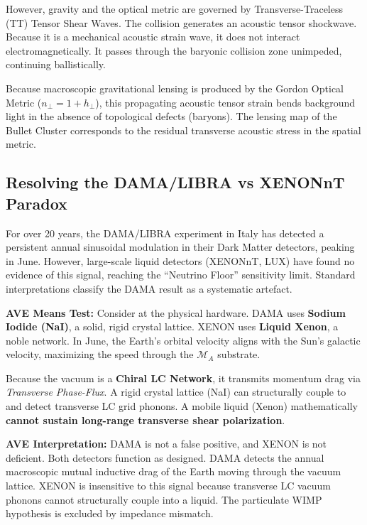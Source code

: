However, gravity and the optical metric are governed by Transverse-Traceless (TT) Tensor Shear Waves. The collision generates an acoustic tensor shockwave. Because it is a mechanical acoustic strain wave, it does not interact electromagnetically. It passes through the baryonic collision zone unimpeded, continuing ballistically. 

Because macroscopic gravitational lensing is produced by the Gordon Optical Metric ($n_\perp = 1 + h_\perp$), this propagating acoustic tensor strain bends background light in the absence of topological defects (baryons). The lensing map of the Bullet Cluster corresponds to the residual transverse acoustic stress in the spatial metric.

\subsection{Resolving the DAMA/LIBRA vs XENONnT Paradox}
For over 20 years, the DAMA/LIBRA experiment in Italy has detected a persistent annual sinusoidal modulation in their Dark Matter detectors, peaking in June. However, large-scale liquid detectors (XENONnT, LUX) have found no evidence of this signal, reaching the ``Neutrino Floor'' sensitivity limit. Standard interpretations classify the DAMA result as a systematic artefact.

\textbf{AVE Means Test:} Consider at the physical hardware. DAMA uses \textbf{Sodium Iodide (NaI)}, a solid, rigid crystal lattice. XENON uses \textbf{Liquid Xenon}, a noble network. In June, the Earth's orbital velocity aligns with the Sun's galactic velocity, maximizing the speed through the $\mathcal{M}_A$ substrate. 

Because the vacuum is a \textbf{Chiral LC Network}, it transmits momentum drag via \textit{Transverse Phase-Flux}. A rigid crystal lattice (NaI) can structurally couple to and detect transverse LC grid phonons. A mobile liquid (Xenon) mathematically \textbf{cannot sustain long-range transverse shear polarization}. 

\textbf{AVE Interpretation:} DAMA is not a false positive, and XENON is not deficient. Both detectors function as designed. DAMA detects the annual macroscopic mutual inductive drag of the Earth moving through the vacuum lattice. XENON is insensitive to this signal because transverse LC vacuum phonons cannot structurally couple into a liquid. The particulate WIMP hypothesis is excluded by impedance mismatch.
